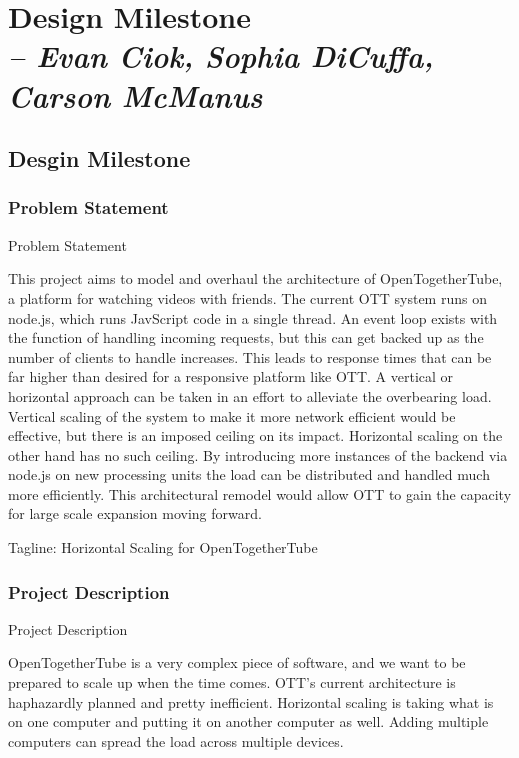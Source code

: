 \chapter{Design Milestone \\
  \small{\textit{-- Evan Ciok, Sophia DiCuffa, Carson McManus}}
  \label{Chapter::designMilestone}}

\section{Desgin Milestone \label{Section::designMilestone}}

\subsection{Problem Statement}
Problem Statement

This project aims to model and overhaul the architecture of OpenTogetherTube, a platform for watching videos with 
friends. The current OTT system runs on node.js, which runs JavScript code in a single thread. An event loop exists 
with the function of handling incoming requests, but this can get backed up as the number of clients to handle 
increases. This leads to response times that can be far higher than desired for a responsive platform like OTT.
A vertical or horizontal approach can be taken in an effort to alleviate the overbearing load. Vertical scaling 
of the system to make it more network efficient would be effective, but there is an imposed ceiling on its impact.
Horizontal scaling on the other hand has no such ceiling. By introducing more instances of the backend via 
node.js on new processing units the load can be distributed and handled much more efficiently. This architectural
remodel would allow OTT to gain the capacity for large scale expansion moving forward.  

Tagline: Horizontal Scaling for OpenTogetherTube

\subsection{Project Description}
Project Description

OpenTogetherTube is a very complex piece of software, and we want to be prepared to scale up when the time comes. OTT's current architecture is haphazardly planned and pretty inefficient. 
Horizontal scaling is taking what is on one computer and putting it on another computer as well. Adding multiple computers can spread the load across multiple devices.

